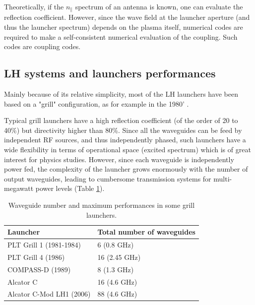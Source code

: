 Theoretically, if the $n_{\parallel}$ spectrum of an antenna is known, one can evaluate the reflection coefficient. However, since the wave field at the launcher aperture (and thus the launcher spectrum) depends on the plasma itself, numerical codes are required to make a self-consistent numerical evaluation of the coupling. Such codes are coupling codes.

\subsection{LH systems and launchers performances}
Mainly because of its relative simplicity, most of the LH launchers have been based on a "grill" configuration, as for example in the 1980' .

Typical grill launchers have a high reflection coefficient (of the order of 20 to 40\%) but directivity higher than 80\%. Since all the waveguides can be feed by independent RF sources, and thus independently phased, such launchers have a wide flexibility in terms of operational space (excited spectrum) which is of great interest for physics studies. However, since each waveguide is independently power fed, the complexity of the launcher grows enormously with the number of output waveguides, leading to cumbersome transmission systems for multi-megawatt power levels (Table \ref{tab:grillperformances}). 

\begin{table}
	{
		\begin{tabular}{| p{6cm} | p{5cm} |}
			\hline 
			Launcher & Total number of waveguides \\
			\hline \hline
			PLT Grill 1 (1981-1984)  \sidecite{stevens1988} & 6 (0.8 GHz) \\
			\hline
			PLT Grill 4 (1986) \sidecite{stevens1988} & 16 (2.45 GHz) \\
			\hline
			COMPASS-D (1989) & 8 (1.3 GHz) \\
			\hline
			Alcator C \sidecite{porkolab1984} & 16 (4.6 GHz) \\
			\hline
			Alcator C-Mod LH1 (2006) & 88 (4.6 GHz) \\
			\hline
		\end{tabular}
	}
	\caption{Waveguide number and maximum performances in some grill launchers.}
	\label{tab:grillperformances}
\end{table}

